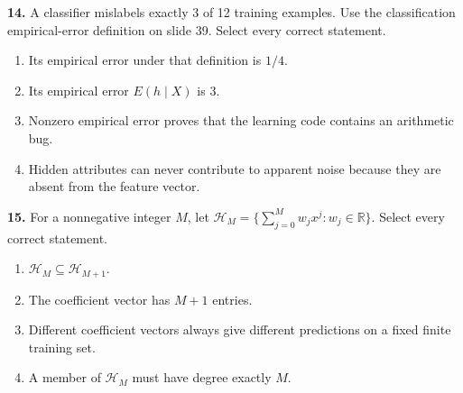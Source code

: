 \documentclass[11pt,a4paper]{article}
\begin{document}
\par\noindent\begin{minipage}{\linewidth}
\textbf{14.} A classifier mislabels exactly 3 of 12 training examples. Use the classification empirical-error definition on slide 39. Select every correct statement.
\begin{enumerate}[label=(\Alph*),leftmargin=8mm,itemsep=2pt,topsep=2pt]
\item Its empirical error under that definition is \(1/4\).
\item Its empirical error \(E(h\mid X)\) is \(3\).
\item Nonzero empirical error proves that the learning code contains an arithmetic bug.
\item Hidden attributes can never contribute to apparent noise because they are absent from the feature vector.
\end{enumerate}

\end{minipage}\par\vspace{3mm}
\par\noindent\begin{minipage}{\linewidth}
\textbf{15.} For a nonnegative integer \(M\), let \(\mathcal H_M=\{\sum_{j=0}^M w_jx^j:w_j\in\mathbb R\}\). Select every correct statement.
\begin{enumerate}[label=(\Alph*),leftmargin=8mm,itemsep=2pt,topsep=2pt]
\item \(\mathcal H_M\subseteq\mathcal H_{M+1}\).
\item The coefficient vector has \(M+1\) entries.
\item Different coefficient vectors always give different predictions on a fixed finite training set.
\item A member of \(\mathcal H_M\) must have degree exactly \(M\).
\end{enumerate}

\end{minipage}\par\vspace{3mm}
\end{document}
